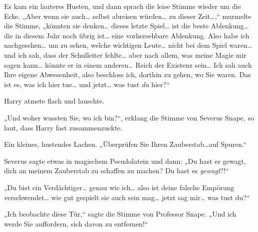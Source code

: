 Es kam ein lauteres Husten, und dann sprach die leise Stimme wieder um die Ecke.
„Aber wenn sie auch… selbst abreisen würden… zu dieser Zeit…,“ murmelte die Stimme, „könnten sie denken… dieses letzte Spiel… ist die beste Ablenkung… die in diesem Jahr noch übrig ist… eine vorhersehbare Ablenkung. Also habe ich nachgesehen… um zu sehen, welche wichtigen Leute… nicht bei dem Spiel waren… und ich sah, dass der Schulleiter fehlte… aber nach allem, was meine Magie mir sagen kann… könnte er in einem anderen… Reich der Existenz sein… Ich sah auch Ihre eigene Abwesenheit, also beschloss ich, dorthin zu gehen, wo Sie waren. Das ist es, was ich hier tue… und jetzt… was tust \emph{du} hier?“

Harry atmete flach und lauschte.

„Und woher wussten Sie, wo ich bin?“, erklang die Stimme von Severus Snape, so laut, dass Harry fast zusammenzuckte.

Ein kleines, hustendes Lachen.
„Überprüfen Sie Ihren Zauberstab…auf Spuren.“

Severus sagte etwas in magischem Pseudolatein und dann:
„Du hast es gewagt, dich an meinem Zauberstab zu schaffen zu machen? Du hast es \emph{gewagt}?!“

„Du bist ein Verdächtiger… genau wie ich… also ist deine falsche Empörung verschwendet… wie gut gespielt sie auch sein mag… jetzt sag mir… was tust du?“

„Ich beobachte diese Tür,“ sagte die Stimme von Professor Snape.
„Und ich werde Sie auffordern, sich davon zu entfernen!“

